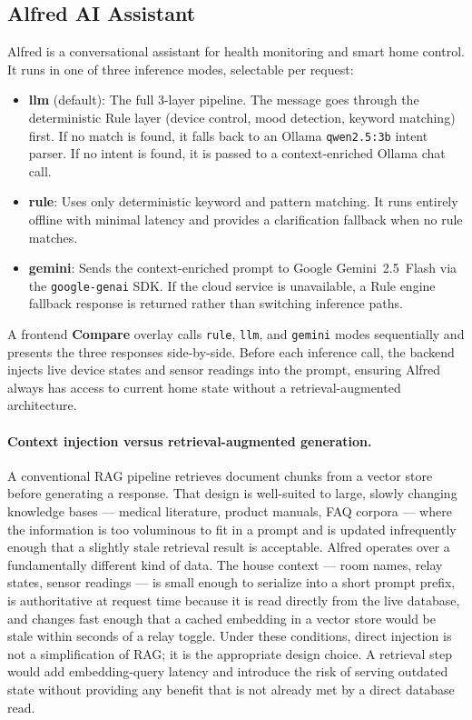 \subsection{Alfred AI Assistant}
\label{sec:alfred_method}

Alfred is a conversational assistant for health monitoring and smart home control. It runs in one of three inference modes, selectable per request:
\begin{itemize}
\item \textbf{llm} (default): The full 3-layer pipeline. The message goes through the deterministic Rule layer (device control, mood detection, keyword matching) first. If no match is found, it falls back to an Ollama \texttt{qwen2.5:3b} intent parser. If no intent is found, it is passed to a context-enriched Ollama chat call.

\item \textbf{rule}: Uses only deterministic keyword and pattern matching. It runs entirely offline with minimal latency and provides a clarification fallback when no rule matches.

\item \textbf{gemini}: Sends the context-enriched prompt to Google Gemini~2.5~Flash via the \texttt{google-genai} SDK. If the cloud service is unavailable, a Rule engine fallback response is returned rather than switching inference paths.

\end{itemize}

A frontend \textbf{Compare} overlay calls \texttt{rule}, \texttt{llm}, and
\texttt{gemini} modes sequentially and presents the three responses
side-by-side. Before each inference call, the backend injects live device
states and sensor readings into the prompt, ensuring Alfred always has access
to current home state without a retrieval-augmented architecture.

\paragraph{Context injection versus retrieval-augmented generation.}
\label{par:context_vs_rag}
A conventional RAG pipeline retrieves document chunks from a vector store before generating a response. That design is well-suited to large, slowly changing knowledge bases --- medical literature, product manuals, FAQ corpora --- where the information is too voluminous to fit in a prompt and is updated infrequently enough that a slightly stale retrieval result is acceptable. Alfred operates over a fundamentally different kind of data. The house context --- room names, relay states, sensor readings --- is small enough to serialize into a short prompt prefix, is authoritative at request time because it is read directly from the live database, and changes fast enough that a cached embedding in a vector store would be stale within seconds of a relay toggle. Under these conditions, direct injection is not a simplification of RAG; it is the appropriate design choice. A retrieval step would add embedding-query latency and introduce the risk of serving outdated state without providing any benefit that is not already met by a direct database read.

